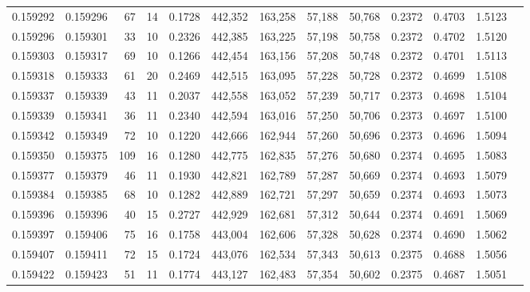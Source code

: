\begin{tabular}{rrrrrrrrrrrrr}
0.159292 & 0.159296 &    67 &  14 &                                     0.1728 & 442,352 & 163,258 &  57,188 &  50,768 & 0.2372 & 0.4703 & 1.5123 \\
0.159296 & 0.159301 &    33 &  10 &                                     0.2326 & 442,385 & 163,225 &  57,198 &  50,758 & 0.2372 & 0.4702 & 1.5120 \\
0.159303 & 0.159317 &    69 &  10 &                                     0.1266 & 442,454 & 163,156 &  57,208 &  50,748 & 0.2372 & 0.4701 & 1.5113 \\
0.159318 & 0.159333 &    61 &  20 &                                     0.2469 & 442,515 & 163,095 &  57,228 &  50,728 & 0.2372 & 0.4699 & 1.5108 \\
0.159337 & 0.159339 &    43 &  11 &                                     0.2037 & 442,558 & 163,052 &  57,239 &  50,717 & 0.2373 & 0.4698 & 1.5104 \\
0.159339 & 0.159341 &    36 &  11 &                                     0.2340 & 442,594 & 163,016 &  57,250 &  50,706 & 0.2373 & 0.4697 & 1.5100 \\
0.159342 & 0.159349 &    72 &  10 &                                     0.1220 & 442,666 & 162,944 &  57,260 &  50,696 & 0.2373 & 0.4696 & 1.5094 \\
0.159350 & 0.159375 &   109 &  16 &                                     0.1280 & 442,775 & 162,835 &  57,276 &  50,680 & 0.2374 & 0.4695 & 1.5083 \\
0.159377 & 0.159379 &    46 &  11 &                                     0.1930 & 442,821 & 162,789 &  57,287 &  50,669 & 0.2374 & 0.4693 & 1.5079 \\
0.159384 & 0.159385 &    68 &  10 &                                     0.1282 & 442,889 & 162,721 &  57,297 &  50,659 & 0.2374 & 0.4693 & 1.5073 \\
0.159396 & 0.159396 &    40 &  15 &                                     0.2727 & 442,929 & 162,681 &  57,312 &  50,644 & 0.2374 & 0.4691 & 1.5069 \\
0.159397 & 0.159406 &    75 &  16 &                                     0.1758 & 443,004 & 162,606 &  57,328 &  50,628 & 0.2374 & 0.4690 & 1.5062 \\
0.159407 & 0.159411 &    72 &  15 &                                     0.1724 & 443,076 & 162,534 &  57,343 &  50,613 & 0.2375 & 0.4688 & 1.5056 \\
0.159422 & 0.159423 &    51 &  11 &                                     0.1774 & 443,127 & 162,483 &  57,354 &  50,602 & 0.2375 & 0.4687 & 1.5051 \\

\end{tabular}
